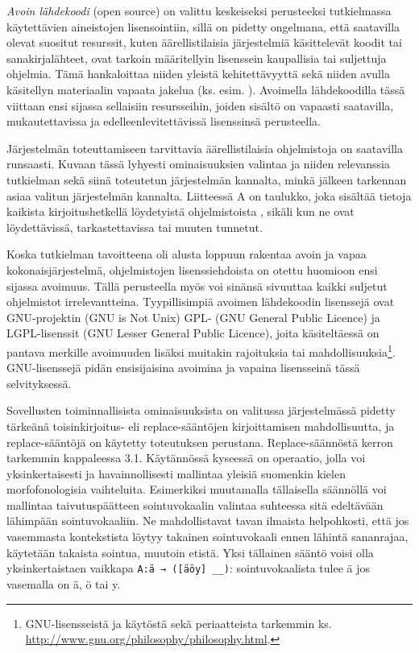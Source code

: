 \documentclass[free]{flammie}
\begin{document}
\textit{Avoin lähdekoodi} (open source)
on valittu keskeiseksi perusteeksi tutkielmassa käytettävien aineistojen
lisensointiin, sillä on pidetty ongelmana, että saatavilla olevat suositut
resurssit, kuten äärellistilaisia järjestelmiä käsittelevät koodit tai
sanakirjalähteet, ovat tarkoin määritellyin lisenssein kaupallisia tai
suljettuja ohjelmia. Tämä hankaloittaa niiden yleistä kehitettävyyttä sekä
niiden avulla käsitellyn materiaalin vapaata jakelua (ks. esim. \cite{yli2005toward}). Avoimella lähdekoodilla tässä viittaan ensi sijassa sellaisiin
resursseihin, joiden sisältö on vapaasti saatavilla, mukautettavissa ja
edelleenlevitettävissä lisenssinsä perusteella.

Järjestelmän toteuttamiseen tarvittavia äärellistilaisia ohjelmistoja on
saatavilla runsaasti. Kuvaan tässä lyhyesti ominaisuuksien valintaa ja niiden
relevanssia tutkielman sekä siinä toteutetun järjestelmän kannalta, minkä
jälkeen tarkennan asiaa valitun järjestelmän kannalta. Liitteessä A on taulukko,
joka sisältää tietoja kaikista kirjoitushetkellä löydetyistä ohjelmistoista
\cite{ylijyra2007}, sikäli kun ne ovat löydettävissä, tarkastettavissa tai muuten
tunnetut.

Koska tutkielman tavoitteena oli alusta loppuun rakentaa avoin ja vapaa
kokonaisjärjestelmä, ohjelmistojen lisenssiehdoista on otettu huomioon ensi
sijassa avoimuus. Tällä perusteella myös voi sinänsä sivuuttaa kaikki suljetut
ohjelmistot irrelevantteina. Tyypillisimpiä avoimen lähdekoodin lisenssejä ovat
GNU-projektin (GNU is Not Unix) GPL- (GNU General Public Licence) ja
LGPL-lisenssit (GNU Lesser General Public Licence), joita käsiteltäessä on
pantava merkille avoimuuden lisäksi muitakin rajoituksia tai
mahdollisuuksia\footnote{GNU-lisensseistä ja käytöstä sekä periaatteista
tarkemmin ks. \url{http://www.gnu.org/philosophy/philosophy.html}.}.  GNU-lisenssejä
pidän ensisijaisina avoimina ja vapaina lisensseinä tässä selvityksessä.

Sovellusten toiminnallisista ominaisuuksista on valitussa järjestelmässä pidetty
tärkeänä toisinkirjoitus- eli replace-sääntöjen kirjoittamisen mahdollisuutta,
ja replace-sääntöjä on käytetty toteutuksen perustana. Replace-säännöstä kerron
tarkemmin kappaleessa 3.1. Käytännössä kyseessä on operaatio, jolla voi
yksinkertaisesti ja havainnollisesti mallintaa yleisiä suomenkin kielen
morfofonologisia vaihteluita. Esimerkiksi muutamalla tällaisella säännöllä voi
mallintaa taivutuspäätteen sointuvokaalin valintaa suhteessa sitä edeltävään
lähimpään sointuvokaaliin. Ne mahdollistavat tavan ilmaista helpohkosti, että
jos vasemmasta kontekstista löytyy takainen sointuvokaali ennen lähintä
sananrajaa, käytetään takaista sointua, muutoin etistä. Yksi tällainen sääntö
voisi olla yksinkertaistaen vaikkapa \verb|A:ä → ([äöy] __)|: sointuvokaalista
tulee ä jos vasemalla on ä, ö tai y.
\end{document}
